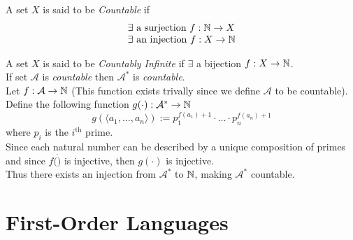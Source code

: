\documentclass[11pt,a4paper]{article}
\begin{document}
A set $X$ is said to be \textit{Countable} if
\[\begin{array}{l}
\exists\text{ a surjection  }f:\mathbb{N}\to X\\
\exists\text{ an injection }f:X\to\mathbb{N}
\end{array}\]

A set $X$ is said to be \textit{Countably Infinite} if $\exists$ a bijection $f:X\to\mathbb{N}$.\\

If set $\mathcal{A}$ is \textit{countable} then $\mathcal{A}^*$ is \textit{countable}.\\

Let $f:\mathcal{A}\to\mathbb{N}$ (This function exists trivally since we define $\mathcal{A}$ to be countable).\\
Define the following function $g(\cdot):\mathcal{A}^*\to\mathbb{N}$
$$g(\langle a_1,\dots,a_n\rangle):=p_1^{f(a_1)+1}\cdot\dots\cdot p_n^{f(a_n)+1}$$
where $p_i$ is the $i^\text{th}$ prime.\\
Since each natural number can be described by a unique composition of primes and since $f(\dot)$ is injective, then $g(\cdot)$ is injective.\\
Thus there exists an injection from $\mathcal{A}^*$ to $\mathbb{N}$, making $\mathcal{A}^*$ countable.\\


\section{First-Order Languages}
\end{document}
